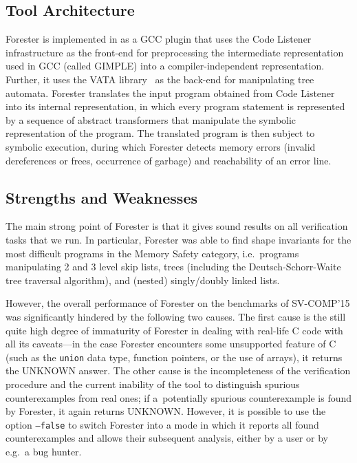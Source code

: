 \subsection{Tool Architecture}\label{sec:architecture}

Forester is implemented in \CCP{} as a GCC plugin that uses the Code
Listener~\cite{codelistener} infrastructure as the front-end for preprocessing the intermediate
representation used in GCC (called GIMPLE) into a compiler-independent
representation.
Further, it uses the VATA library~\cite{VATA} as the back-end for manipulating
tree automata.
Forester translates the input program obtained from Code Listener into its
internal representation, in which every program statement is represented by a
sequence of abstract transformers that manipulate the symbolic representation of
the program.
The translated program is then subject to symbolic execution, during which
Forester detects memory errors (invalid dereferences or frees, occurrence of
garbage) and reachability of an error line.

\subsection{Strengths and Weaknesses}\label{sec:strengths}

The main strong point of Forester is that it gives sound results on all
verification tasks that we run.
In particular, Forester was able to find shape invariants for the most difficult programs
in the Memory Safety category, i.e.~programs manipulating 2 and 3 level skip
lists, trees (including the Deutsch-Schorr-Waite tree traversal algorithm), and
(nested) singly/doubly linked lists.

However, the overall performance of Forester on the benchmarks of SV-COMP'15 was
significantly hindered by the following two causes.
The first cause is the still quite high degree of immaturity of Forester
in dealing with real-life C code with all its caveats---in
the case Forester encounters some unsupported feature of C (such as the
\texttt{union} data type, function pointers, or the use of arrays), it returns
the \textsf{UNKNOWN} answer.
The other cause is the incompleteness of the verification procedure and the
current inability of the tool to distinguish spurious counterexamples from real
ones; if a~potentially spurious counterexample is found by Forester, it again returns
\textsf{UNKNOWN}.
However, it is possible to use the option \texttt{--false} to switch Forester into a mode in which it reports all
found counterexamples and allows their subsequent analysis, either by a user or
by e.g.~a bug hunter.


